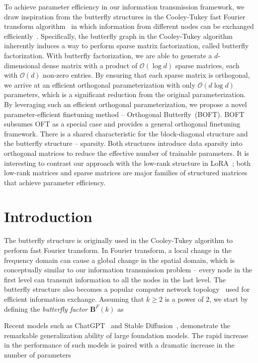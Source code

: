 To achieve parameter efficiency in our information transmission framework, we draw inspiration from the butterfly structures in the Cooley-Tukey fast Fourier transform algorithm~\cite{cooley1965algorithm} in which information from different nodes can be exchanged efficiently~\cite{klasing1994broadcasting}. Specifically, the butterfly graph in the Cooley-Tukey algorithm inherently induces a way to perform sparse matrix factorization, called butterfly factorization. With butterfly factorization, we are able to generate a $d$-dimensional dense matrix with a product of $\mathcal{O}(\log d)$ sparse matrices, each with $\mathcal{O}(d)$ non-zero entries. By ensuring that each sparse matrix is orthogonal, we arrive at an efficient orthogonal parameterization with only $\mathcal{O}(d\log d)$  parameters, which is a significant reduction from the original parameterization. By leveraging such an efficient orthogonal parameterization, we propose a novel parameter-efficient finetuning method -- Orthogonal Butterfly~(BOFT). BOFT subsumes OFT as a special case and provides a general orthogonal finetuning framework. There is a shared characteristic for the block-diagonal structure and the butterfly structure -- sparsity. Both structures introduce data sparsity into orthogonal matrices to reduce the effective number of trainable parameters.  It is interesting to   contrast our approach with the low-rank structure in LoRA~\cite{hulora2022};  both low-rank matrices and sparse matrices are major families of structured matrices~\cite{candes2011robust} that achieve parameter efficiency. 



\section{Introduction}

The butterfly structure is originally used in the Cooley-Tukey algorithm to perform fast Fourier transform. In Fourier transform, a local change in the frequency domain can cause a global change in the spatial domain, which is conceptually similar to our information transmission problem -- every node in the first level can transmit information to all the nodes in the last level. The butterfly structure also becomes a popular computer network topology~\cite{solihin2015fundamentals,li2011linear} used for efficient information exchange. Assuming that $k\geq 2$ is a power of $2$, we start by defining the \emph{butterfly factor} $\bm{B}^F(k)$ as

Recent models such as ChatGPT~\cite{brown2020language,chen2021evaluating} and Stable Diffusion~\cite{rombach2022high}, demonstrate the remarkable generalization ability of large foundation models. The rapid increase in the performance of such models is paired with a dramatic increase in the number of parameters

